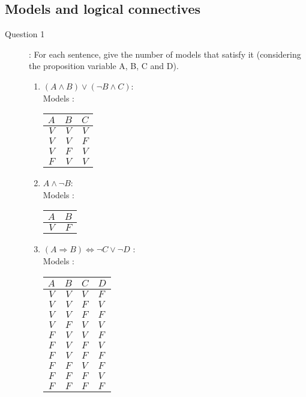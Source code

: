 \subsection{Models and logical connectives}
\begin{description}
\item[Question 1]: For each sentence, give the number of models that satisfy it (considering the proposition variable A, B, C and D). \\
\begin{enumerate}
\item $(A \wedge B) \vee ( \neg B \wedge C)$:\\
Models : \\
\begin{center}
\begin{tabular}{|c|c|c|}
\hline
$A$ & $B$ & $C$ \\
\hline
$V$ & $V$ & $V$\\
$V$ & $V$ & $F$\\
$V$ & $F$ & $V$\\
$F$ & $V$ & $V$\\
\hline
\end{tabular}
\end{center}
\item $A \wedge \neg B$:\\
Models : \\
\begin{center}
\begin{tabular}{|c|c|}
\hline
$A$ & $B$\\
\hline
$V$ & $F$ \\
\hline
\end{tabular}
\end{center}
\item $(A \Rightarrow B) \Leftrightarrow \neg C \vee \neg D$ : \\
Models : \\
\begin{center}
\begin{tabular}{|c|c|}
\hline
$A$ & $B$ & $C$ & $D$\\
\hline
$V$ & $V$ & $V$ & $F$\\
$V$ & $V$ & $F$ & $V$\\
$V$ & $V$ & $F$ & $F$\\
$V$ & $F$ & $V$ & $V$\\
$F$ & $V$ & $V$ & $F$\\
$F$ & $V$ & $F$ & $V$\\
$F$ & $V$ & $F$ & $F$\\
$F$ & $F$ & $V$ & $F$\\
$F$ & $F$ & $F$ & $V$\\
$F$ & $F$ & $F$ & $F$\\
\hline
\end{tabular}
\end{center}
\end{enumerate}
\end{description}

